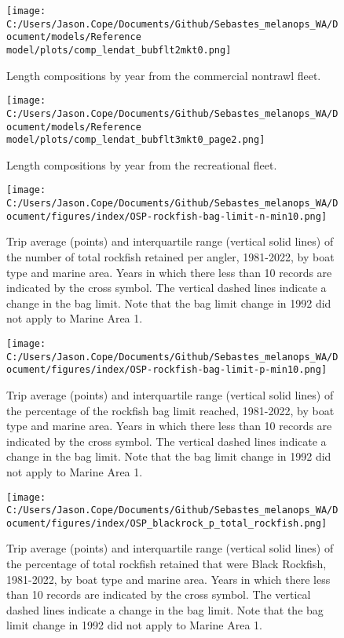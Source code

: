 \documentclass[11pt,
  english,
  letterpaper,
]{article}
\begin{document}
\pagebreak

\begin{figure}
\centering
\texttt{[image: C:/Users/Jason.Cope/Documents/Github/Sebastes\_melanops\_WA/Document/models/Reference model/plots/comp\_lendat\_bubflt2mkt0.png]}
\caption{Length compositions by year from the commercial nontrawl fleet.\label{fig:nontrawl-length-comps}}
\end{figure}

\pagebreak

\begin{figure}
\centering
\texttt{[image: C:/Users/Jason.Cope/Documents/Github/Sebastes\_melanops\_WA/Document/models/Reference model/plots/comp\_lendat\_bubflt3mkt0\_page2.png]}
\caption{Length compositions by year from the recreational fleet.\label{fig:rec-length-comps}}
\end{figure}

\pagebreak

\begin{figure}
\centering
\texttt{[image: C:/Users/Jason.Cope/Documents/Github/Sebastes\_melanops\_WA/Document/figures/index/OSP-rockfish-bag-limit-n-min10.png]}
\caption{Trip average (points) and interquartile range (vertical solid lines) of the number of total rockfish retained per angler, 1981-2022, by boat type and marine area. Years in which there less than 10 records are indicated by the cross symbol. The vertical dashed lines indicate a change in the bag limit. Note that the bag limit change in 1992 did not apply to Marine Area 1.\label{fig:baglimit_numbers}}
\end{figure}

\begin{figure}
\centering
\texttt{[image: C:/Users/Jason.Cope/Documents/Github/Sebastes\_melanops\_WA/Document/figures/index/OSP-rockfish-bag-limit-p-min10.png]}
\caption{Trip average (points) and interquartile range (vertical solid lines) of the percentage of the rockfish bag limit reached, 1981-2022, by boat type and marine area. Years in which there less than 10 records are indicated by the cross symbol. The vertical dashed lines indicate a change in the bag limit. Note that the bag limit change in 1992 did not apply to Marine Area 1.\label{fig:baglimit_percentage}}
\end{figure}

\begin{figure}
\centering
\texttt{[image: C:/Users/Jason.Cope/Documents/Github/Sebastes\_melanops\_WA/Document/figures/index/OSP\_blackrock\_p\_total\_rockfish.png]}
\caption{Trip average (points) and interquartile range (vertical solid lines) of the percentage of total rockfish retained that were Black Rockfish, 1981-2022, by boat type and marine area. Years in which there less than 10 records are indicated by the cross symbol. The vertical dashed lines indicate a change in the bag limit. Note that the bag limit change in 1992 did not apply to Marine Area 1.\label{fig:blackrock_percentage}}
\end{figure}
\end{document}
